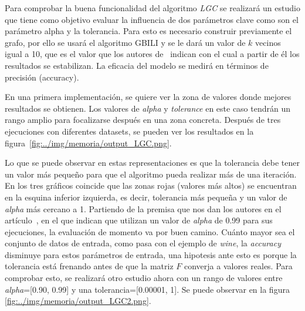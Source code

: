 Para comprobar la buena funcionalidad del algoritmo \textit{LGC} se realizará un estudio que tiene como objetivo evaluar la influencia de dos parámetros clave como son el parámetro alpha y la tolerancia. Para esto es necesario construir previamente el grafo, por ello se usará el algoritmo GBILI y se le dará un valor de $k$ vecinos igual a 10, que es el valor que los autores de~\cite{gbili} indican con el cual a partir de él los resultados se estabilizan. La eficacia del modelo se medirá en términos de precisión (accuracy).

En una primera implementación, se quiere ver la zona de valores donde mejores resultados se obtienen. Los valores de \textit{alpha} y \textit{tolerance} en este caso tendrán un rango amplio para focalizarse después en una zona concreta. Después de tres ejecuciones con diferentes datasets, se pueden ver los resultados en la figura~\ref{fig:../img/memoria/output_LGC.png}.

Lo que se puede observar en estas representaciones es que la tolerancia debe tener un valor más pequeño para que el algoritmo pueda realizar más de una iteración. En los tres gráficos coincide que las zonas rojas (valores más altos) se encuentran en la esquina inferior izquierda, es decir, tolerancia más pequeña y un valor de \textit{alpha} más cercano a 1. Partiendo de la premisa que nos dan los autores en el artículo~\cite{LGC}, en el que indican que utilizan un valor de \textit{alpha} de 0.99 para sus ejecuciones, la evaluación de momento va por buen camino. Cuánto mayor sea el conjunto de datos de entrada, como pasa con el ejemplo de \textit{wine}, la \textit{accuracy} disminuye para estos parámetros de entrada, una hipotesis ante esto es porque la tolerancia está frenando antes de que la matriz $F$ converja a valores reales.
Para comprobar esto, se realizará otro estudio ahora con un rango de valores entre \textit{alpha}=[0.90, 0.99] y una tolerancia=[0.00001, 1]. Se puede observar en la figura \ref{fig:../img/memoria/output_LGC2.png}.

